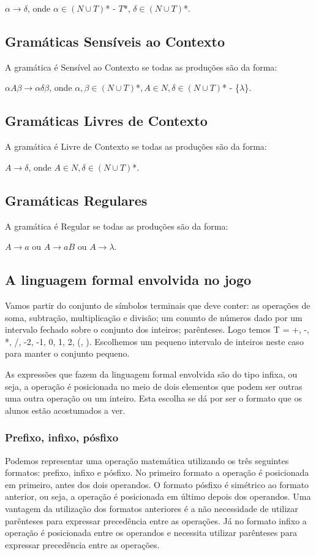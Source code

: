 $\alpha \to \delta$, onde $\alpha \in (N \cup T)$* - $T$*, $\delta \in (N \cup T)$*.

\subsection{Gramáticas Sensíveis ao Contexto}
A gramática é Sensível ao Contexto se todas as produções são da forma:

$\alpha A\beta \to \alpha \delta \beta$, onde $\alpha,\beta \in (N \cup T)$*$, A \in N, \delta \in (N \cup T)$* - \{$\lambda$\}.

\subsection{Gramáticas Livres de Contexto}
A gramática é Livre de Contexto se todas as produções são da forma:

$A \to \delta$, onde $A \in N, \delta \in (N \cup T)$*.

\subsection{Gramáticas Regulares}
A gramática é Regular se todas as produções são da forma:

$A \to a$ ou $A \to aB$ ou $A \to \lambda$.

\subsection{A linguagem formal envolvida no jogo}
Vamos partir do conjunto de símbolos terminais que deve conter: as operações de soma, subtração, multiplicação e divisão; um conunto de números dado por um intervalo fechado sobre o conjunto dos inteiros; parênteses. Logo temos T = {+, -, *, /, -2, -1, 0, 1, 2, (, )}. Escolhemos um pequeno intervalo de inteiros neste caso para manter o conjunto pequeno.

	As expressões que fazem da linguagem formal envolvida são do tipo infixa, ou seja, a operação é posicionada no meio de dois elementos que podem ser outras uma outra operação ou um inteiro. Esta escolha se dá por ser o formato que os alunos estão acostumados a ver.
	
\subsubsection{Prefixo, infixo, pósfixo}
Podemos representar uma operação matemática utilizando os três seguintes formatos: prefixo, infixo e pósfixo. No primeiro formato a operação é posicionada em primeiro, antes dos dois operandos. O formato pósfixo é simétrico ao formato anterior, ou seja, a operação é posicionada em último depois dos operandos. Uma vantagem da utilização dos formatos anteriores é a não necessidade de utilizar parênteses para expressar precedência entre as operações. Já no formato infixo a operação é posicionada entre os operandos e necessita utilizar parênteses para expressar precedência entre as operações.

